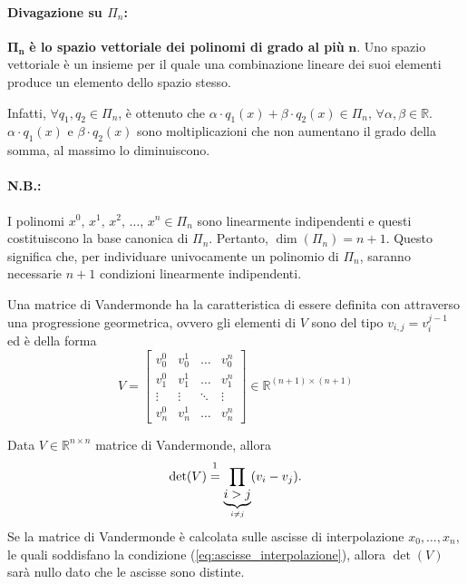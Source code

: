 \paragraph{Divagazione su $\Pi_n$:}	$\boldsymbol{\Pi_n}$ \textbf{è lo spazio vettoriale dei polinomi di grado al più} $\boldsymbol n$. Uno spazio vettoriale è un insieme per il quale una combinazione lineare dei suoi elementi produce un elemento dello spazio stesso.

\noindent Infatti, $\forall q_1, q_2\in\Pi_n$, è ottenuto che $\alpha \cdot q_1(x)+\beta\cdot q_2(x)\in\Pi_n,\, \forall \alpha,\beta\in\mathbb R$. $\alpha \cdot q_1(x)$ e $\beta\cdot q_2(x)$ sono moltiplicazioni che non aumentano il grado della somma, al massimo lo diminuiscono.

\paragraph{N.B.:} I polinomi $x^0,\, x^1,\, x^2,\, \hdots,\, x^n\in\Pi_n$ sono linearmente indipendenti e questi costituiscono la base canonica di $\Pi_n$. Pertanto, $\dim(\Pi_n)=n+1$. Questo significa che, per individuare univocamente un polinomio di $\Pi_n$,  saranno necessarie $n+1$ condizioni linearmente indipendenti.

 \begin{definition}
	Una matrice di Vandermonde ha la caratteristica di essere definita con attraverso una progressione geormetrica, ovvero gli elementi di $V$ sono del tipo $v_{i,j}=v_i^{j-1}$ ed è della forma
	 \begin{equation*}
	 	V=\begin{bmatrix}
	 		v_0^0 & v_0^1 & \hdots & v_0^n\\
	 		v_1^0 & v_1^1 & \hdots & v_1^n\\
	 		\vdots & \vdots &\ddots & \vdots\\
	 		v_n^0 & v_n^1 & \hdots & v_n^n
	 	\end{bmatrix}\in\mathbb R^{(n+1)\times (n+1)}
	 \end{equation*}
\end{definition}

\begin{property}\label{prop:determinante_matrice_vandermonde}
	Data $V\in\mathbb{R}^{n\times n}$ matrice di Vandermonde, allora
	\begin{equation}\label{eq:determinante_matrice_vandermonde}
		\det(V)\overset{\footnotemark}{=}\prod_{\underbrace{i>j}_{i\neq j}}(v_i-v_j).
	\end{equation}
	Se la matrice di Vandermonde è calcolata sulle ascisse di interpolazione $x_0, \hdots, x_n$, le quali soddisfano la condizione (\ref{eq:ascisse_interpolazione}), allora $\det(V)$ sarà nullo dato che le ascisse sono distinte.
\end{property}

